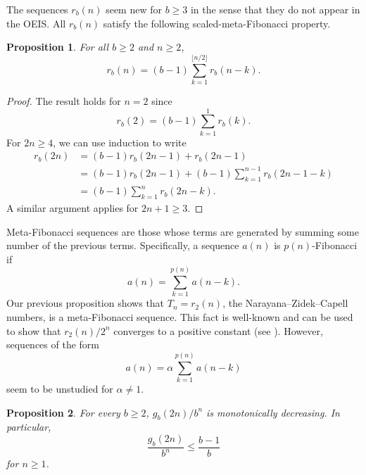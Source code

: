 \documentclass[12pt]{amsart}
\newtheorem{proposition}{Proposition}
\theoremstyle{definition}
\begin{document}
The sequences $r_b(n)$ seem new for $b \geq 3$ in the sense that they do not
appear in the OEIS. All $r_b(n)$ satisfy the following scaled-meta-Fibonacci
property.

\begin{proposition}
    For all $b \geq 2$ and $n \geq 2$,
    \begin{equation*}
        r_b(n) = (b - 1) \sum_{k = 1}^{\lfloor n / 2 \rfloor} r_b(n - k).
    \end{equation*}
\end{proposition}

\begin{proof}
    The result holds for $n = 2$ since
    \begin{equation*}
        r_b(2) = (b - 1) \sum_{k = 1}^1 r_b(k).
    \end{equation*}
    For $2n \geq 4$, we can use induction to write
    \begin{align*}
        r_b(2n) &= (b - 1) r_b(2n - 1) + r_b(2n - 1) \\
                &= (b - 1) r_b(2n - 1) + (b - 1) \sum_{k = 1}^{n - 1} r_b(2n - 1 - k) \\
                &= (b - 1) \sum_{k = 1}^n r_b(2n - k).
    \end{align*}
    A similar argument applies for $2n + 1 \geq 3$.
\end{proof}

Meta-Fibonacci sequences are those whose terms are generated by summing some
number of the previous terms. Specifically, a sequence $a(n)$ is
$p(n)$-Fibonacci if
\begin{equation*}
    a(n) = \sum_{k = 1}^{p(n)} a(n - k).
\end{equation*}
Our previous proposition shows that $T_n = r_2(n)$, the Narayana--Zidek--Capell
numbers, is a meta-Fibonacci sequence. This fact is well-known and can be used
to show that $r_2(n) / 2^n$ converges to a positive constant (see
\cite{emerson2005family}). However, sequences of the form
\begin{equation*}
    a(n) = \alpha \sum_{k = 1}^{p(n)} a(n - k)
\end{equation*}
seem to be unstudied for $\alpha \neq 1$.

\begin{proposition}
    For every $b \geq 2$, $g_b(2n) / b^n$ is monotonically decreasing. In
    particular,
    \begin{equation*}
        \frac{g_b(2n)}{b^n} \leq \frac{b - 1}{b}
    \end{equation*}
    for $n \geq 1$.
\end{proposition}
\end{document}
